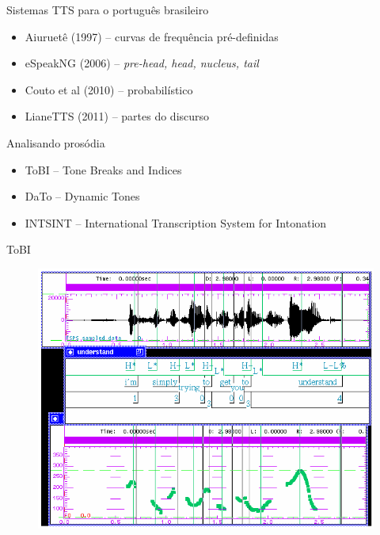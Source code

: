 \documentclass{beamer}
\begin{document}
\begin{frame}{Sistemas TTS para o português brasileiro}
  \begin{itemize}
      \item Aiuruetê (1997) -- curvas de frequência pré-definidas
      \item eSpeakNG (2006) -- \emph{pre-head, head, nucleus, tail}
      \item Couto et al (2010) -- probabilístico
      \item LianeTTS (2011) -- partes do discurso
  \end{itemize}
\end{frame}

\begin{frame}{Analisando prosódia}
  \begin{itemize}
  \item ToBI -- Tone Breaks and Indices
  \item DaTo -- Dynamic Tones
  \item INTSINT -- International Transcription System for Intonation
  \end{itemize}
\end{frame}

\begin{frame}{ToBI}
    \begin{figure}
      \includegraphics[scale=0.40]{tobi.png}
    \end{figure}
\end{frame}
\end{document}

